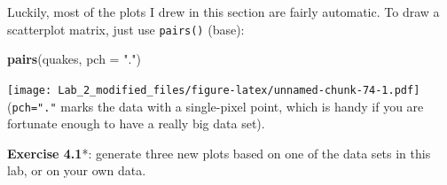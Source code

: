 \documentclass[11pt,]{article}
\newenvironment{Shaded}{\begin{snugshade}}{\end{snugshade}}
\newcommand{\KeywordTok}[1]{\textcolor[rgb]{0.13,0.29,0.53}{\textbf{#1}}}
\newcommand{\DataTypeTok}[1]{\textcolor[rgb]{0.13,0.29,0.53}{#1}}
\newcommand{\StringTok}[1]{\textcolor[rgb]{0.31,0.60,0.02}{#1}}
\newcommand{\NormalTok}[1]{#1}
\begin{document}
Luckily, most of the plots I drew in this section are fairly automatic.
To draw a scatterplot matrix, just use \texttt{pairs()} (base):

\begin{Shaded}
\begin{Highlighting}[]
\KeywordTok{pairs}\NormalTok{(quakes, }\DataTypeTok{pch =} \StringTok{"."}\NormalTok{)}
\end{Highlighting}
\end{Shaded}

\texttt{[image: Lab\_2\_modified\_files/figure-latex/unnamed-chunk-74-1.pdf]}
(\texttt{pch="."} marks the data with a single-pixel point, which is
handy if you are fortunate enough to have a really big data set).

\textbf{Exercise 4.1}*: generate three new plots based on one of the
data sets in this lab, or on your own data.
\end{document}
